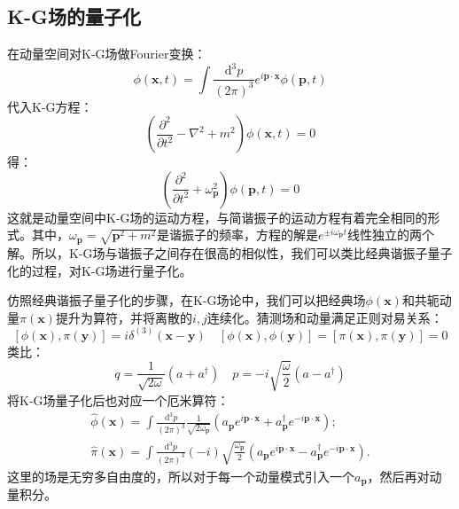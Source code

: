 \documentclass{book}
\begin{document}
\subsection{K-G场的量子化}
在动量空间对K-G场做Fourier变换：
$$
\phi(\mathbf{x},t)=\int\frac{\mathrm{d}^3p}{(2\pi)^3}{e}^{{i}\mathbf{p}\cdot\mathbf{x}}{\phi}(\mathbf{p},t)
$$
代入K-G方程：
$$
\left(\frac{\partial^2}{\partial t^2}-\nabla^2+m^2\right)\phi(\mathbf{x},t)=0
$$
得：
$$
\left(\frac{\partial^2}{\partial t^2}+\omega_{\mathbf{p}}^2\right)\phi(\mathbf{p},t)=0
$$
这就是动量空间中K-G场的运动方程，与简谐振子的运动方程有着完全相同的形式。其中，$\omega_{\mathbf{p}}=\sqrt{\mathbf{p}^2+m^2}$是谐振子的频率，方程的解是${e}^{\pm{i}\omega_{\mathbf{p}}t}$线性独立的两个解。所以，K-G场与谐振子之间存在很高的相似性，我们可以类比经典谐振子量子化的过程，对K-G场进行量子化。

仿照经典谐振子量子化的步骤，在K-G场论中，我们可以把经典场$\phi(\mathbf{x})$和共轭动量$\pi(\mathbf{x})$提升为算符，并将离散的$i,j$连续化。猜测场和动量满足正则对易关系：
$$
[\phi(\mathbf{x}),\pi(\mathbf{y})]=i\delta^{(3)}(\mathbf{x}-\mathbf{y})\quad [\phi(\mathbf{x}),\phi(\mathbf{y})]=[\pi(\mathbf{x}),\pi(\mathbf{y})]=0
$$
类比：
$$
q=\frac1{\sqrt{2\omega}}(a+a^\dagger)\quad p=-i\sqrt{\frac\omega2}(a-a^\dagger)
$$
将K-G场量子化后也对应一个厄米算符：
$$
\begin{gathered}
\hat{\phi}(\mathbf{x}) =\int\frac{\mathrm{d}^{3}p}{(2\pi)^{3}}\left.\frac1{\sqrt{2\omega_{\mathbf{p}}}}\left(a_{\mathbf{p}}{e}^{{i}\mathbf{p}\cdot\mathbf{x}}+a_{\mathbf{p}}^{\dagger}{e}^{-{i}\mathbf{p}\cdot\mathbf{x}}\right);\right.  \\
\hat{\pi}(\mathbf{x}) =\int\frac{\mathrm{d}^3p}{(2\pi)^3}\left(-{i}\right)\sqrt{\frac{\omega_{\mathbf{p}}}2}\left(a_{\mathbf{p}}{e}^{{i}\mathbf{p}\cdot\mathbf{x}}-a_{\mathbf{p}}^{\dagger}{e}^{-{i}\mathbf{p}\cdot\mathbf{x}}\right). 
\end{gathered}
$$
这里的场是无穷多自由度的，所以对于每一个动量模式引入一个$a_{\mathbf{p}}$，然后再对动量积分。
\end{document}
